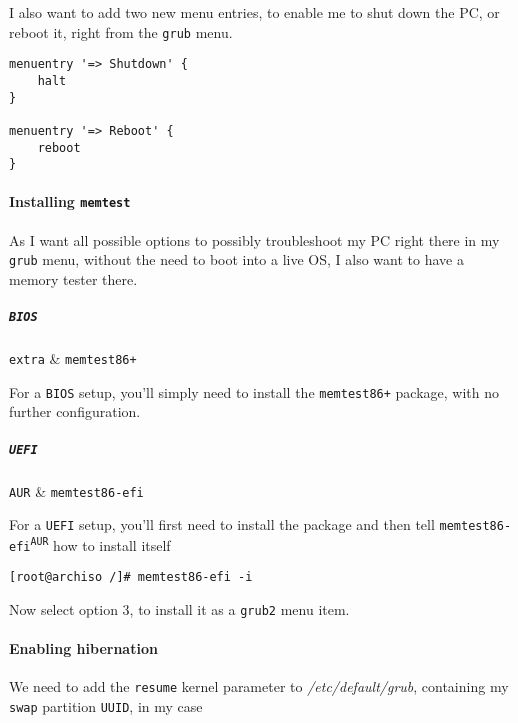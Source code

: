 \documentclass[10pt]{dustdoc}
\begin{document}
I also want to add two new menu entries, to enable me to shut down the PC, or reboot it, right from the \texttt{grub} menu.

\begin{verbatim}
menuentry '=> Shutdown' {
    halt
}

menuentry '=> Reboot' {
    reboot
}
\end{verbatim}

\paragraph{Installing \texttt{memtest}}
\label{par:installing-memtest}

As I want all possible options to possibly troubleshoot my PC right there in my \texttt{grub} menu,  without the need to boot into a live OS, I also want to have a memory tester there.

\subparagraph{\texttt{BIOS}}
\label{par:installing-memtest-bios}

\begin{packagetable}
    \texttt{extra} & \texttt{memtest86+} \\ 
\end{packagetable}

For a \texttt{BIOS} setup, you’ll simply need to install the \texttt{memtest86+} package, with no further configuration.

\subparagraph{\texttt{UEFI}}
\label{par:installing-memtest-uefi}

\begin{packagetable}
    \texttt{AUR} & \texttt{memtest86-efi} \\ 
\end{packagetable}

For a \texttt{UEFI} setup, you’ll first need to install the package and then tell \texttt{memtest86-efi\textsuperscript{\texttt{AUR}}} how to install itself

\begin{verbatim}
[root@archiso /]# memtest86-efi -i
\end{verbatim}

Now select option 3, to install it as a \texttt{grub2} menu item.

\paragraph{Enabling hibernation}
\label{par:enabling-hibernation}

We need to add the \texttt{resume} kernel parameter to \textit{/etc/default/grub}, containing my \texttt{swap} partition \texttt{UUID}, in my case
\end{document}
